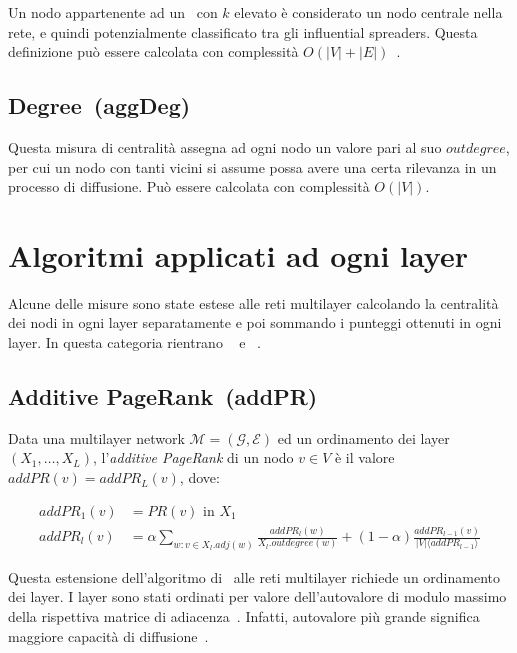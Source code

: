 Un nodo appartenente ad un \kcore\ con $k$ elevato è considerato un nodo centrale 
nella rete, e quindi potenzialmente classificato tra gli influential spreaders.
Questa definizione può essere calcolata con complessità $O(|V| + |E|)$~\cite{batagelj:kcore}.

\subsection{Degree~(aggDeg)}
Questa misura di centralità assegna ad ogni nodo un valore pari al suo $\mathit{outdegree}$, 
per cui un nodo con tanti vicini si assume possa avere una certa rilevanza in un 
processo di diffusione.
Può essere calcolata con complessità $O(|V|)$.

\section{Algoritmi applicati ad ogni layer}
Alcune delle misure sono state estese alle reti multilayer calcolando la centralità
dei nodi in ogni layer separatamente e poi sommando i punteggi ottenuti in ogni layer.
In questa categoria rientrano \emph{\addPageRank}~\cite{halu:addpagerank} 
e \emph{\sumCore}~\cite{basaras:infspmul}.

\subsection{Additive PageRank~(addPR)}
\begin{definizione}[\addPageRank]
    Data una multilayer network $\mathcal{M}=(\mathcal{G}, \mathcal{E})$ 
    ed un ordinamento dei layer $(X_1, \dots, X_{L})$, l'\emph{additive PageRank}
    di un nodo $v \in V$ è il valore 
    $\mathit{addPR}(v) = \mathit{addPR}_L(v)$, dove:

    \begin{equation*}
        \begin{split}
\mathit{addPR}_1(v)&= \mathit{PR}(v) \text{ in } X_1 \\
\mathit{addPR}_l(v)&= \alpha \sum_{w : v \in X_l.\mathit{adj}(w)} 
            \frac{\mathit{addPR}_l(w)}{X_l.\mathit{outdegree}(w)} + 
            (1-\alpha)\frac{\mathit{addPR}_{l-1}(v)}{|V| \langle \mathit{addPR}_{l-1} \rangle}
        \end{split}
    \end{equation*}

\end{definizione}

Questa estensione dell'algoritmo di \PageRank\ alle reti multilayer richiede un ordinamento
dei layer. I layer sono stati ordinati per valore
dell'autovalore di modulo massimo della rispettiva matrice di adiacenza~\cite{basaras:infspmul}. Infatti, 
autovalore più grande significa maggiore capacità di diffusione~\cite{wang:eigenv}.

